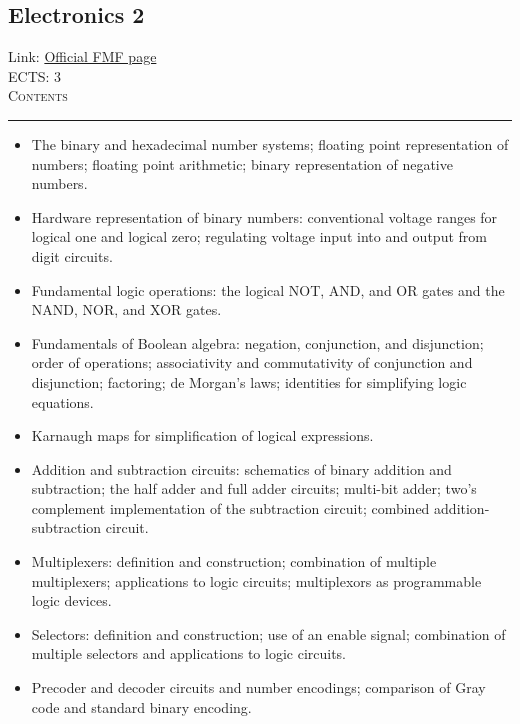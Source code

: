 \documentclass[11pt, a4paper]{article}
\newenvironment{course}[3]{
\subsection{#1}%
Link: \href{#2}{Official FMF page}\\%
ECTS: #3%
\vspace{1ex}
\\
{\large \textsc{Contents}}\\[-0.9ex]%
\rule{\textwidth}{0.5pt}
\vspace{-3ex}
}
{}
\newenvironment{chapter}[1]{
\begin{tcolorbox}[title=#1, breakable]
}
{\end{tcolorbox}}
\begin{document}
\begin{course}{Electronics 2}{https://www.fmf.uni-lj.si/en/study-physics/programmes/1fiz/2020/7000777/courses/1135/}{3}
    \label{electronics-2}

    \begin{chapter}{Foundations of digital electronics}
        \begin{itemize}
        
            \item The binary and hexadecimal number systems; floating point representation of numbers; floating point arithmetic; binary representation of negative numbers.

            \item Hardware representation of binary numbers: conventional voltage ranges for logical one and logical zero; regulating voltage input into and output from digit circuits.

            \item Fundamental logic operations: the logical NOT, AND, and OR gates and the NAND, NOR, and XOR gates.

            \item Fundamentals of Boolean algebra: negation, conjunction, and disjunction; order of operations; associativity and commutativity of conjunction and disjunction; factoring; de Morgan's laws; identities for simplifying logic equations.

            \item Karnaugh maps for simplification of logical expressions.

            \item Addition and subtraction circuits: schematics of binary addition and subtraction; the half adder and full adder circuits; multi-bit adder; two's complement implementation of the subtraction circuit; combined addition-subtraction circuit.

            \item Multiplexers: definition and construction; combination of multiple multiplexers; applications to logic circuits; multiplexors as programmable logic devices.

            \item Selectors: definition and construction; use of an enable signal; combination of multiple selectors and applications to logic circuits.

            \item Precoder and decoder circuits and number encodings; comparison of Gray code and standard binary encoding.


\end{itemize}
\end{chapter}
\end{course}
\end{document}
